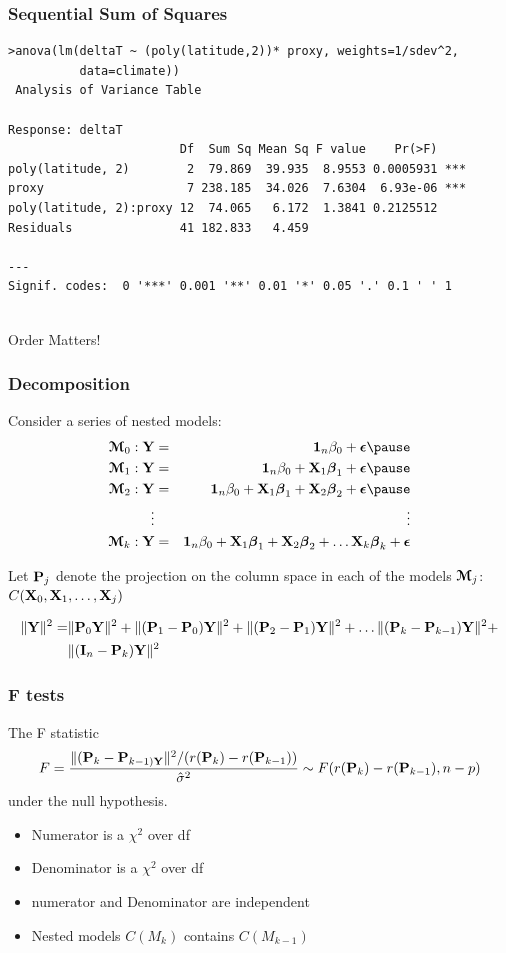\documentclass[handout]{beamer}
\begin{document}
\begin{frame}[fragile]
 \frametitle{Sequential Sum of Squares}
   \begin{small}
\begin{verbatim}
>anova(lm(deltaT ~ (poly(latitude,2))* proxy, weights=1/sdev^2,
          data=climate))
 Analysis of Variance Table

Response: deltaT
                        Df  Sum Sq Mean Sq F value    Pr(>F)    
poly(latitude, 2)        2  79.869  39.935  8.9553 0.0005931 ***
proxy                    7 238.185  34.026  7.6304  6.93e-06 ***
poly(latitude, 2):proxy 12  74.065   6.172  1.3841 0.2125512    
Residuals               41 182.833   4.459                      
                   
---
Signif. codes:  0 '***' 0.001 '**' 0.01 '*' 0.05 '.' 0.1 ' ' 1 
 
\end{verbatim}
\end{small}
Order Matters!
\end{frame}
\begin{frame}
  \frametitle{Decomposition}
  Consider a series of nested models: \pause
  \begin{eqnarray*}
    \M_0: \Y & = & \one_n \beta_0 + \eps   \pause\\
\M_1: \Y & = & \one_n \beta_0 + \X_1 \b_1 + \eps  \pause \\
\M_2: \Y & = & \one_n \beta_0 + \X_1 \b_1 + \X_2 \b_2 + \eps   \pause\\
\vdots & & \vdots \\
\M_k: \Y & = & \one_n \beta_0 + \X_1 \b_1 + \X_2 \b_2 + \ldots \X_k \b_k + \eps 
  \end{eqnarray*} \pause

Let $\P_j$ denote the projection on the column space in each of the
models $\M_j$: $C(\X_0, \X_1, \ldots, \X_j)$ \pause
\begin{small}
  \begin{align*}
\| \Y \|^2 =&  \| \P_0 \Y\|^2 + \| (\P_1 - \P_0) \Y \|^2 + \|(\P_2
- \P_1)\Y\|^2 + \ldots \| (\P_k - \P_{k-1})\Y \|^2 + \\ 
& \|(\I_n -
\P_k)\Y\|^2
 \end{align*}
\end{small}

\end{frame}
\begin{frame}
  \frametitle{F tests}
The F statistic
$$F =  \frac{\| (\P_k - \P_{k-1 )\Y} \|^2 /(r(\P_{k}) - r(\P_{k-1})) }
{\hat{\sigma}^2} \sim F( r(\P_{k}) - r(\P_{k-1}),  n - p)$$
under the null hypothesis.\pause
\begin{itemize}
\item Numerator is a $\chi^2$ over df \pause
\item Denominator is a $\chi^2$ over df \pause
\item numerator and Denominator are independent \pause

\item Nested models $C(M_k)$ contains $C(M_{k-1})$ \pause
\end{itemize}
\end{frame}
\end{document}
